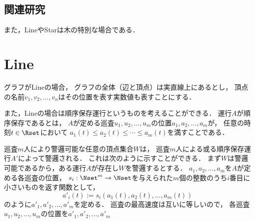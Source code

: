 \subsection*{関連研究}



また，LineやStarは木の特別な場合である．



\section{Line}
\label{section: line}

グラフがLineの場合，
グラフの全体（辺と頂点）は実直線上にあるとし，
頂点の名前$v_1, v_2, \ldots, v_n$はその位置を表す実数値も表すことにする．

また，Lineの場合は順序保存運行というものを考えることができる．
運行$A$が順序保存であるとは，
$A$が定める巡査$u_1, u_2, \ldots, u_m$の位置$a_1, a_2, \ldots, a_m$が，
任意の時刻$t \in \Rset$において
$a_1(t) \leq a_2(t) \leq \cdots \leq a_m(t)$を満すことである．

巡査$m$人により警邏可能な任意の頂点集合$W$は，
巡査$m$人による或る順序保存運行$A'$によって警邏される．
%
これは次のように示すことができる．
%
まず$W$は警邏可能であるから，ある運行$A$が存在し$W$を警邏するとする．
$a_1, a_2, \ldots, a_m$を$A$が定める各巡査の位置，
$s_i : \Nset^m \to \Nset$を与えられた$m$個の整数のうち$i$番目に小さいものを返す関数として，
\[ a'_i(t) := s_i( a_1(t), a_2(t), \ldots, a_m(t) ) \]
のように$a'_1, a'_2, \ldots, a'_m$を定める．
巡査の最高速度は互いに等しいので，
各巡査$u_1, u_2, \ldots, u_m$の位置を$a'_1, a'_2, \ldots, a'_m$%

%

